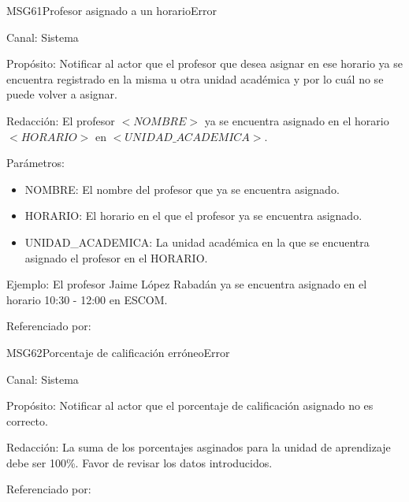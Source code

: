 \begin{mensaje}{MSG61}{Profesor asignado a un horario}{Error}
	\item[Canal:] Sistema
	\item[Propósito:] Notificar al actor que el profesor que desea asignar en ese horario ya se encuentra registrado en la misma u otra unidad académica y por lo cuál no se puede volver a asignar.
	\item[Redacción:] El profesor $<NOMBRE>$ ya se encuentra asignado en el horario $<HORARIO>$ en $<UNIDAD\_ACADEMICA>$.
	\item[Parámetros:] 
	\begin{itemize}
		\item NOMBRE: El nombre del profesor que ya se encuentra asignado.
		\item HORARIO: El horario en el que el profesor ya se encuentra asignado.
		\item UNIDAD\_ACADEMICA: La unidad académica en la que se encuentra asignado el profesor en el HORARIO.
	\end{itemize}
	\item[Ejemplo:] El profesor Jaime López Rabadán ya se encuentra asignado en el horario 10:30 - 12:00 en ESCOM.
	\item[Referenciado por: ] 
\end{mensaje}


\begin{mensaje}{MSG62}{Porcentaje de calificación erróneo}{Error}
	\item[Canal:] Sistema
	\item[Propósito:] Notificar al actor que el porcentaje de calificación asignado no es correcto.
	\item[Redacción:] La suma de los porcentajes asginados para la unidad de aprendizaje debe ser 100\%. Favor de revisar los datos introducidos.	
	\item[Referenciado por: ] 
\end{mensaje}

